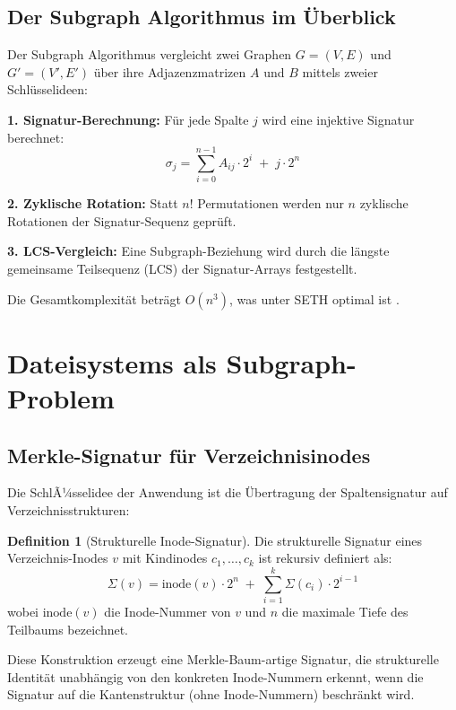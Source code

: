 ﻿\documentclass[a4paper,12pt]{article}
\theoremstyle{definition}
\newtheorem{definition}{Definition}
\begin{document}
\subsection{Der Subgraph Algorithmus im \"Uberblick}

Der Subgraph Algorithmus \cite{epp2026subgraph} vergleicht zwei Graphen
$G = (V, E)$ und $G' = (V', E')$ \"uber ihre Adjazenzmatrizen $A$ und $B$
mittels zweier Schl\"usselideen:

\textbf{1. Signatur-Berechnung:} F\"ur jede Spalte $j$ wird eine injektive
Signatur berechnet:
\[
    \sigma_j = \sum_{i=0}^{n-1} A_{ij} \cdot 2^i \;+\; j \cdot 2^n
\]

\textbf{2. Zyklische Rotation:} Statt $n!$ Permutationen werden nur $n$
zyklische Rotationen der Signatur-Sequenz gepr\"uft.

\textbf{3. LCS-Vergleich:} Eine Subgraph-Beziehung wird durch die l\"angste
gemeinsame Teilsequenz (LCS) der Signatur-Arrays festgestellt.

Die Gesamtkomplexit\"at betr\"agt $O(n^3)$, was unter SETH optimal ist
\cite{epp2026subgraph}.

\section{Dateisystems als Subgraph-Problem}

\subsection{Merkle-Signatur f\"ur Verzeichnisinodes}

Die SchlÃ¼sselidee der Anwendung ist die \"Ubertragung der Spaltensignatur auf
Verzeichnisstrukturen:

\begin{definition}[Strukturelle Inode-Signatur]
    Die strukturelle Signatur eines Verzeichnis-Inodes $v$ mit
    Kindinodes $c_1, \ldots, c_k$ ist rekursiv definiert als:
    \[
        \Sigma(v) = \text{inode}(v) \cdot 2^n \;+\;
        \sum_{i=1}^{k} \Sigma(c_i) \cdot 2^{i-1}
    \]
    wobei $\text{inode}(v)$ die Inode-Nummer von $v$ und $n$ die maximale
    Tiefe des Teilbaums bezeichnet.
\end{definition}

Diese Konstruktion erzeugt eine Merkle-Baum-artige Signatur, die strukturelle
Identit\"at unabh\"angig von den konkreten Inode-Nummern erkennt, wenn die
Signatur auf die Kantenstruktur (ohne Inode-Nummern) beschr\"ankt wird.
\end{document}
